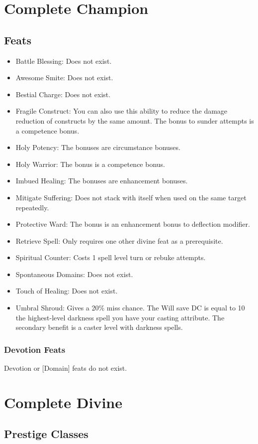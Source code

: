 \section{Complete Champion}
\subsection{Feats}
\begin{itemize}
\item Battle Blessing: Does not exist.
\item Awesome Smite: Does not exist.
\item Bestial Charge: Does not exist.
\item Fragile Construct: You can also use this ability to reduce the damage reduction of constructs by the same amount. The bonus to sunder attempts is a competence bonus.
\item Holy Potency: The bonuses are circumstance bonuses.
\item Holy Warrior: The bonus is a competence bonus.
\item Imbued Healing: The bonuses are enhancement bonuses.
\item Mitigate Suffering: Does not stack with itself when used on the same target repeatedly.
\item Protective Ward: The bonus is an enhancement bonus to deflection modifier.
\item Retrieve Spell: Only requires one other divine feat as a prerequisite.
\item Spiritual Counter: Costs 1 \add spell level turn or rebuke attempts.
\item Spontaneous Domains: Does not exist.
\item Touch of Healing: Does not exist.
\item Umbral Shroud: Gives a 20\% miss chance. The Will save DC is equal to 10 \add the highest-level darkness spell you have \add your casting attribute. The secondary benefit is a  caster level with darkness spells.
\end{itemize}
\subsubsection{Devotion Feats}
Devotion or [Domain] feats do not exist.

\section{Complete Divine}
\subsection{Prestige Classes}
